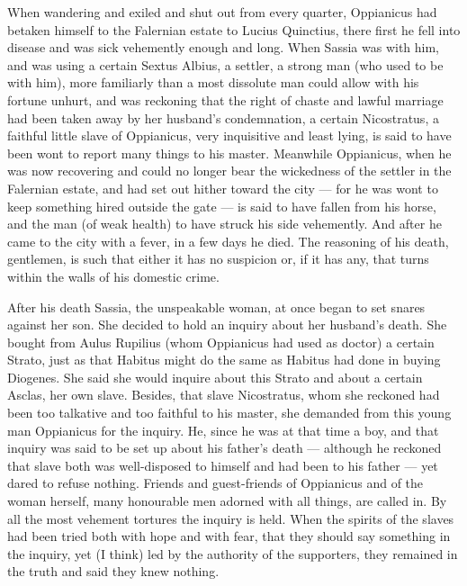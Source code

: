  When wandering and exiled and shut out from every quarter, Oppianicus had betaken himself to the Falernian estate to Lucius Quinctius, there first he fell into disease and was sick vehemently enough and long. When Sassia was with him, and was using a certain Sextus Albius, a settler, a strong man (who used to be with him), more familiarly than a most dissolute man could allow with his fortune unhurt, and was reckoning that the right of chaste and lawful marriage had been taken away by her husband's condemnation, a certain Nicostratus, a faithful little slave of Oppianicus, very inquisitive and least lying, is said to have been wont to report many things to his master. Meanwhile Oppianicus, when he was now recovering and could no longer bear the wickedness of the settler in the Falernian estate, and had set out hither toward the city --- for he was wont to keep something hired outside the gate --- is said to have fallen from his horse, and the man (of weak health) to have struck his side vehemently. And after he came to the city with a fever, in a few days he died. The reasoning of his death, gentlemen, is such that either it has no suspicion or, if it has any, that turns within the walls of his domestic crime.

 After his death Sassia, the unspeakable woman, at once began to set snares against her son. She decided to hold an inquiry about her husband's death. She bought from Aulus Rupilius (whom Oppianicus had used as doctor) a certain Strato, just as that Habitus might do the same as Habitus had done in buying Diogenes. She said she would inquire about this Strato and about a certain Asclas, her own slave. Besides, that slave Nicostratus, whom she reckoned had been too talkative and too faithful to his master, she demanded from this young man Oppianicus for the inquiry. He, since he was at that time a boy, and that inquiry was said to be set up about his father's death --- although he reckoned that slave both was well-disposed to himself and had been to his father --- yet dared to refuse nothing. Friends and guest-friends of Oppianicus and of the woman herself, many honourable men adorned with all things, are called in. By all the most vehement tortures the inquiry is held. When the spirits of the slaves had been tried both with hope and with fear, that they should say something in the inquiry, yet (I think) led by the authority of the supporters, they remained in the truth and said they knew nothing.


